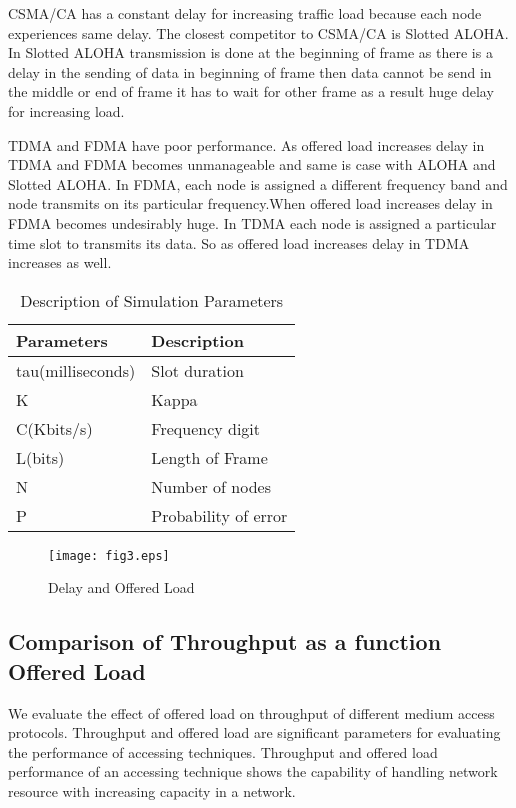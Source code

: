 \documentclass[11pt, conference, compsocconf, onecolumn]{IEEEtran}
\begin{document}
CSMA/CA has a constant delay for increasing traffic load because each node experiences same delay. The closest competitor to CSMA/CA is Slotted ALOHA. In Slotted ALOHA transmission is done at the beginning of frame as there is a delay in the sending of data in beginning of frame then data cannot be send in the middle or end of frame it has to wait for other frame as a result huge delay for increasing load.

TDMA and FDMA have poor performance. As offered load increases delay in TDMA and FDMA becomes unmanageable and same is case with ALOHA and Slotted ALOHA. In FDMA, each node is assigned a different frequency band and node transmits on its particular frequency.When offered load increases delay in FDMA becomes undesirably huge. In TDMA each node is assigned a particular time slot to transmits its data. So as offered load increases delay in TDMA increases as well.

\begin{table}
\caption{Description of Simulation Parameters}
\begin{center}
    \begin{tabular}{ | p{2.5cm} | p{2.5cm} |}
    \hline
    Parameters & Description\\ \hline
    tau(milliseconds) & Slot duration\\ \hline
    K & Kappa\\ \hline
    C(Kbits/s) & Frequency digit\\ \hline
    L(bits) & Length of Frame\\ \hline
    N & Number of nodes\\ \hline
    P & Probability of error\\ \hline
    \end{tabular}
\end{center}
\end{table}
\begin{figure}[!h]
\centering
\caption{Delay and Offered Load}
\texttt{[image: fig3.eps]}
\end{figure}

\subsection{Comparison of Throughput as a function Offered Load}

We evaluate the effect of offered load on throughput of different medium access protocols. Throughput and offered load are significant parameters for evaluating the performance of accessing techniques. Throughput and offered load performance of an accessing technique shows the capability of handling network resource with increasing capacity in a network.
\end{document}
